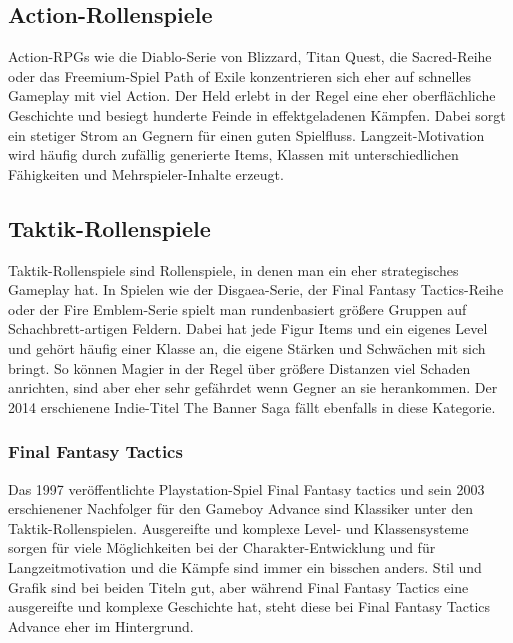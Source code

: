 \documentclass[extern,palatino]{cgBA}
\begin{document}
\subsection{Action-Rollenspiele}
Action-RPGs wie die Diablo-Serie von Blizzard, Titan Quest, die Sacred-Reihe oder das Freemium-Spiel Path of Exile konzentrieren sich eher auf schnelles Gameplay mit viel Action. Der Held erlebt in der Regel eine eher oberflächliche Geschichte und besiegt hunderte Feinde in effektgeladenen Kämpfen. Dabei sorgt ein stetiger Strom an Gegnern für einen guten Spielfluss. Langzeit-Motivation wird häufig durch zufällig generierte Items, Klassen mit unterschiedlichen Fähigkeiten und Mehrspieler-Inhalte erzeugt.
\subsection{Taktik-Rollenspiele}
Taktik-Rollenspiele sind Rollenspiele, in denen man ein eher strategisches Gameplay hat. In Spielen wie der Disgaea-Serie, der Final Fantasy Tactics-Reihe oder der Fire Emblem-Serie spielt man rundenbasiert größere Gruppen auf Schachbrett-artigen Feldern. Dabei hat jede Figur Items und ein eigenes Level und gehört häufig einer Klasse an, die eigene Stärken und Schwächen mit sich bringt. So können Magier in der Regel über größere Distanzen viel Schaden anrichten, sind aber eher sehr gefährdet wenn Gegner an sie herankommen. Der 2014 erschienene Indie-Titel The Banner Saga fällt ebenfalls in diese Kategorie.
\subsubsection{Final Fantasy Tactics}
Das 1997 veröffentlichte Playstation-Spiel Final Fantasy tactics und sein 2003 erschienener Nachfolger für den Gameboy Advance sind Klassiker unter den Taktik-Rollenspielen. Ausgereifte und komplexe Level- und Klassensysteme sorgen für viele Möglichkeiten bei der Charakter-Entwicklung und für Langzeitmotivation und die Kämpfe sind immer ein bisschen anders. Stil und Grafik sind bei beiden Titeln gut, aber während Final Fantasy Tactics eine ausgereifte und komplexe Geschichte hat, steht diese bei Final Fantasy Tactics Advance eher im Hintergrund.
\end{document}
